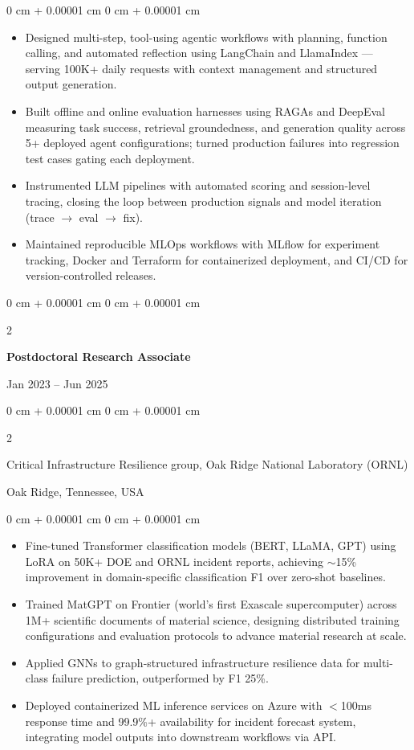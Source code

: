 \documentclass[10pt, letterpaper]{article}
\newenvironment{highlights}{
    \begin{itemize}[
        topsep=0.10 cm,
        parsep=0.10 cm,
        partopsep=0pt,
        itemsep=0pt,
        leftmargin=0 cm + 10pt
    ]
}{
    \end{itemize}
} %
\newenvironment{onecolentry}{
    \begin{adjustwidth}{
        0 cm + 0.00001 cm
    }{
        0 cm + 0.00001 cm
    }
}{
    \end{adjustwidth}
} %
\newenvironment{twocolentry}[2][]{
    \onecolentry
    \def\secondColumn{#2}
    \setcolumnwidth{\fill, 4.5 cm}
    \begin{paracol}{2}
}{
    \switchcolumn \raggedleft \secondColumn
    \end{paracol}
    \endonecolentry
} %
\begin{document}
    \begin{onecolentry}
        \begin{highlights}
            \item Designed multi-step, tool-using agentic workflows with planning, function calling, and automated reflection using LangChain and LlamaIndex — serving 100K+ daily requests with context management and structured output generation.
            \item Built offline and online evaluation harnesses using RAGAs and DeepEval measuring task success, retrieval groundedness, and generation quality across 5+ deployed agent configurations; turned production failures into regression test cases gating each deployment.
            \item Instrumented LLM pipelines with automated scoring and session-level tracing, closing the loop between production signals and model iteration (trace $\rightarrow$ eval $\rightarrow$ fix).
            \item Maintained reproducible MLOps workflows with MLflow for experiment tracking, Docker and Terraform for containerized deployment, and CI/CD for version-controlled releases.
        \end{highlights}
    \end{onecolentry}

\vspace{1mm}

    \begin{twocolentry}{Jan 2023 -- Jun 2025}
        \textbf{Postdoctoral Research Associate}
    \end{twocolentry}
    \begin{twocolentry}{Oak Ridge, Tennessee, USA}
        Critical Infrastructure Resilience group, Oak Ridge National Laboratory (ORNL)
    \end{twocolentry}
    \vspace{0.10 cm}
    \begin{onecolentry}
        \begin{highlights}
            \item Fine-tuned Transformer classification models (BERT, LLaMA, GPT) using LoRA on 50K+ DOE and ORNL incident reports, achieving $\sim$15\% improvement in domain-specific classification F1 over zero-shot baselines.
            \item Trained MatGPT on Frontier (world’s first Exascale supercomputer) across 1M+ scientific documents of material science, designing distributed training configurations and evaluation protocols to advance material research at scale.
            \item Applied GNNs to graph-structured infrastructure resilience data for multi-class failure prediction, outperformed by F1 25\%.
            \item Deployed containerized ML inference services on Azure with $<$100ms response time and 99.9\%+ availability for incident forecast system, integrating model outputs into downstream workflows via API.
        \end{highlights}
    \end{onecolentry}
\end{document}

